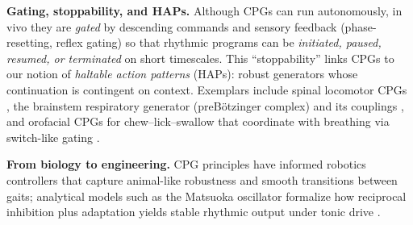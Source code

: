 \textbf{Gating, stoppability, and HAPs.} Although CPGs can run autonomously, in vivo they are \emph{gated} by descending commands and sensory feedback (phase-resetting, reflex gating) so that rhythmic programs can be \emph{initiated, paused, resumed, or terminated} on short timescales. This “stoppability” links CPGs to our notion of \emph{haltable action patterns} (HAPs): robust generators whose continuation is contingent on context. Exemplars include spinal locomotor CPGs \citep{Kiehn2016NRN}, the brainstem respiratory generator (preB\"otzinger complex) and its couplings \citep{DelNegro2018BreathingMatters}, and orofacial CPGs for chew–lick–swallow that coordinate with breathing via switch-like gating \citep{Moore2014OrofacialCPG}. 

\textbf{From biology to engineering.} CPG principles have informed robotics controllers that capture animal-like robustness and smooth transitions between gaits; analytical models such as the Matsuoka oscillator formalize how reciprocal inhibition plus adaptation yields stable rhythmic output under tonic drive \citep{Ijspeert2008NN,Matsuoka1985BiolCybern}.
